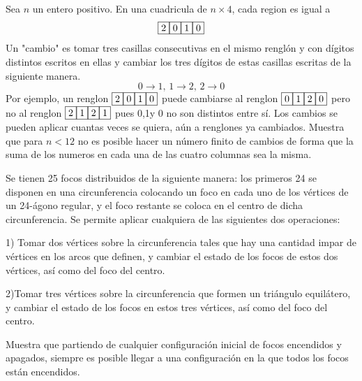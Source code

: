 \documentclass[11pt]{scrartcl}
\begin{document}
\begin{problem}
    [2010/4] Sea $n$ un entero positivo. En una cuadricula de $n\times 4$, cada region es igual a 
    $$\fbox{2}\fbox{0}\fbox{1}\fbox{0}$$
    Un "cambio" es tomar tres casillas consecutivas en el mismo renglón y con dígitos distintos escritos en ellas y cambiar los tres dígitos de estas casillas escritas de la siguiente manera.
    $$0\rightarrow 1 \text{, }1\rightarrow 2 \text{, }2\rightarrow 0$$
    Por ejemplo, un renglon $\fbox{2}\fbox{0}\fbox{1}\fbox{0}$ puede cambiarse al renglon $\fbox{0}\fbox{1}\fbox{2}\fbox{0}$ pero no al renglon $\fbox{2}\fbox{1}\fbox{2}\fbox{1}$ pues 0,1y 0 no son distintos entre sí. Los cambios se pueden aplicar cuantas veces se quiera, aún a renglones ya cambiados. Muestra que para $n<12$ no es posible hacer un número finito de cambios de forma que la suma de los numeros en cada una de las cuatro columnas sea la misma. 
\end{problem}
\begin{problem}
    [2011/1] 
    Se tienen 25 focos distribuidos de la siguiente manera: los primeros 24 se disponen en una
circunferencia colocando un foco en cada uno de los vértices de un 24-ágono regular, y el
foco restante se coloca en el centro de dicha circunferencia.
Se permite aplicar cualquiera de las siguientes dos operaciones:

1) Tomar dos vértices sobre la circunferencia tales que hay una cantidad impar de
vértices en los arcos que definen, y cambiar el estado de los focos de estos dos
vértices, así como del foco del centro.

2)Tomar tres vértices sobre la circunferencia que formen un triángulo equilátero, y
cambiar el estado de los focos en estos tres vértices, así como del foco del centro.

Muestra que partiendo de cualquier configuración inicial de focos encendidos y apagados,
siempre es posible llegar a una configuración en la que todos los focos están encendidos.
\end{problem}
\end{document}
